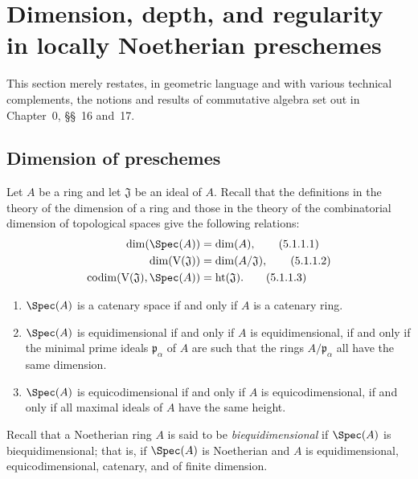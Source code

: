 \section{Dimension, depth, and regularity in locally Noetherian preschemes}
\label{section:IV.5}


This section merely restates, in geometric language and with various
technical complements, the notions and results of commutative algebra
set out in Chapter~0, \S\S~16 and~17.

\subsection{Dimension of preschemes}
\label{subsection:IV.5.1}

\begin{env}[5.1.1]
\label{IV.5.1.1}
Let $A$ be a ring and let $\mathfrak J$ be an ideal of $A$.
Recall  that the definitions in the theory of the
dimension of a ring  and those in the theory of the
combinatorial dimension of topological spaces  give
the following relations:
\begin{align}
\dim(\Spec(A))&=\dim(A),
\tag{5.1.1.1}\label{IV.5.1.1.1}\\
\dim(\mathrm V(\mathfrak J))&=\dim(A/\mathfrak J),
\tag{5.1.1.2}\label{IV.5.1.1.2}\\
\operatorname{codim}(\mathrm V(\mathfrak J),\Spec(A))
  &=\operatorname{ht}(\mathfrak J).
\tag{5.1.1.3}\label{IV.5.1.1.3}
\end{align}

\begin{enumerate}
\item[\rm(5.1.1.4)]
\label{IV.5.1.1.4}
$\Spec(A)$ is a catenary space if and only if $A$ is a catenary ring.
\item[\rm(5.1.1.5)]
\label{IV.5.1.1.5}
$\Spec(A)$ is equidimensional if and only if $A$ is equidimensional,
if and only if the minimal prime ideals $\mathfrak p_\alpha$ of $A$
are such that the rings $A/\mathfrak p_\alpha$ all have the same
dimension.
\item[\rm(5.1.1.6)]
\label{IV.5.1.1.6}
$\Spec(A)$ is equicodimensional if and only if $A$ is
equicodimensional, if and only if all maximal ideals of $A$ have the
same height.
\end{enumerate}

Recall that a Noetherian ring $A$ is said to be
\emph{biequidimensional} if $\Spec(A)$ is biequidimensional; that is,
if $\Spec(A)$ is Noetherian and $A$ is equidimensional,
equicodimensional, catenary, and of finite dimension.
\end{env}

